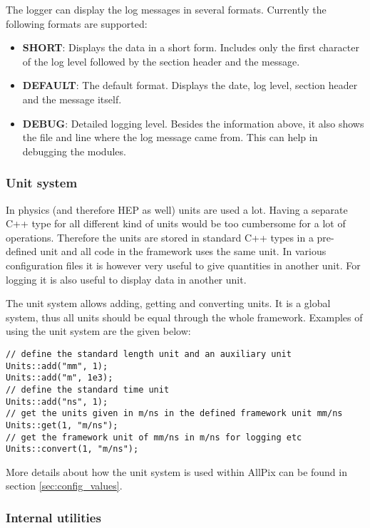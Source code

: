 The logger can display the log messages in several formats. Currently the following formats are supported:
\begin{itemize}
\item \textbf{SHORT}: Displays the data in a short form. Includes only the first character of the log level followed by the section header and the message.
\item \textbf{DEFAULT}: The default format. Displays the date, log level, section header and the message itself. 
\item \textbf{DEBUG}: Detailed logging level. Besides the information above, it also shows the file and line where the log message came from. This can help in debugging the modules.
\end{itemize}

\subsubsection{Unit system}
\label{sec:unit_system}
In physics (and therefore HEP as well) units are used a lot. Having a separate C++ type for all different kind of units would be too cumbersome for a lot of operations. Therefore the units are stored in standard C++ types in a pre-defined unit and all code in the framework uses the same unit. In various configuration files it is however very useful to give quantities in another unit. For logging it is also useful to display data in another unit.

The unit system allows adding, getting and converting units. It is a global system, thus all units should be equal through the whole framework. Examples of using the unit system are the given below:
\begin{verbatim}
// define the standard length unit and an auxiliary unit
Units::add("mm", 1); 
Units::add("m", 1e3); 
// define the standard time unit
Units::add("ns", 1); 
// get the units given in m/ns in the defined framework unit mm/ns
Units::get(1, "m/ns"); 
// get the framework unit of mm/ns in m/ns for logging etc
Units::convert(1, "m/ns");
\end{verbatim}

More details about how the unit system is used within AllPix can be found in section \ref{sec:config_values}.

\subsubsection{Internal utilities}
